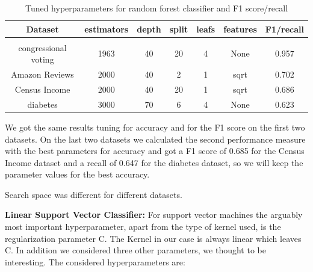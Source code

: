 \documentclass[a4paper,10pt]{article}
\begin{document}
\begin{table}[h!]
    \centering
    \begin{tabular}{|c|c|c|c|c|c|c|}
    \hline
    Dataset & \textsf{estimators} & \textsf{depth} & \textsf{split} & \textsf{leafs} & \textsf{features} & F1/recall \\
    \hline
    \multicolumn{7}{c}{\vspace{-0.4cm}} \\ %
    \hline
    congressional voting & 1963 & 40 & 20 & 4 & None & 0.957 \\%
    \hline
    Amazon Reviews & 2000 & 40 & 2 & 1 & sqrt & 0.702 \\%
    \hline
    Census Income & 2000 & 40 & 20 & 1 & sqrt & 0.686 \\%
    \hline
    diabetes & 3000 & 70 & 6 & 4 & None & 0.623 \\%
    \hline
    \end{tabular}
    \caption{Tuned hyperparameters for random forest classifier and F1 score/recall} 
    \label{table:tu_hyp_rf_f1}
    \end{table}

We got the same results tuning for accuracy and for the F1 score on the first two datasets. On the last two datasets we calculated the second performance measure with the best parameters for accuracy and got a F1 score of 0.685 for the Census Income dataset and a recall of 0.647 for the diabetes dataset, so we will keep the parameter values for the best accuracy.

Search space was different for different datasets.


\textbf{Linear Support Vector Classifier:} For support vector machines the arguably most important hyperparameter, apart from the type of kernel used, is the regularization parameter \textsf{C}. The Kernel in our case is always linear which leaves \textsf{C}. In addition we considered three other parameters, we thought to be interesting. The considered hyperparameters are:
\end{document}
